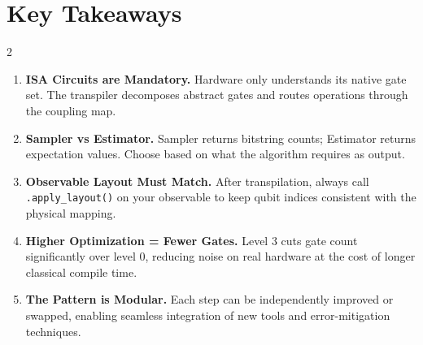 ﻿\documentclass[10pt, a4paper]{article}
\begin{document}
\section*{\color{ibmblue}Key Takeaways}
\begin{multicols}{2}
\begin{enumerate}[label=\textbf{\arabic*.}]
  \item \textbf{ISA Circuits are Mandatory.} Hardware only understands its native gate set. The transpiler decomposes abstract gates and routes operations through the coupling map.
  \item \textbf{Sampler vs Estimator.} Sampler returns bitstring counts; Estimator returns expectation values. Choose based on what the algorithm requires as output.
  \item \textbf{Observable Layout Must Match.} After transpilation, always call \texttt{.apply\_layout()} on your observable to keep qubit indices consistent with the physical mapping.
  \item \textbf{Higher Optimization = Fewer Gates.} Level 3 cuts gate count significantly over level 0, reducing noise on real hardware at the cost of longer classical compile time.
  \item \textbf{The Pattern is Modular.} Each step can be independently improved or swapped, enabling seamless integration of new tools and error-mitigation techniques.
\end{enumerate}
\end{multicols}
\end{document}
